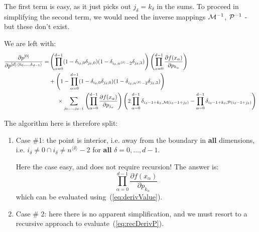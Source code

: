 \documentclass[11pt]{article}
\begin{document}
The first term is easy, as it just picks out $j_\delta = k_\delta$ in the sums. To proceed in simplifying the second term, we would need the inverse mappings ${\cal M}^{-1}$, ${\cal P}^{-1}$ - but these don't exist. 

We are left with:
\begin{equation}
\begin{split}	
\frac{\partial p^{[0]}}{\partial p^{[d]: \langle k_0, \dots, k_{d-1} \rangle}}
=&
\left ( \prod_{\alpha = 0}^{d-1} (1 - \delta_{i_\delta,0}\delta_{j_\delta,0}) (1 - \delta_{i_\delta,n^{\langle \delta \rangle}-2}\delta_{j_\delta,3}) \right )
\left (
\prod_{\alpha=0}^{d-1} 
\frac{
\partial f(x_\alpha)
}{
\partial p_{k_\alpha}
}
\right ) \\
&+ \left ( 1 - \prod_{\alpha = 0}^{d-1} (1 - \delta_{i_\delta,0}\delta_{j_\delta,0}) (1 - \delta_{i_\delta,n^{\langle \delta \rangle}-2}\delta_{j_\delta,3}) \right ) \\
&\hspace{5mm} \times
\sum_{j_0, \dots, j_{d-1}}
\left (
\prod_{\alpha=0}^{d-1} 
\frac{
\partial f(x_\alpha)
}{
\partial p_{j_\alpha}
}
\right ) 
\left (
2 
\prod_{\alpha=0}^{d-1} \delta_{i_\delta-1+k_\delta, {\cal M}(i_\delta-1+j_\delta) }
-
\prod_{\alpha=0}^{d-1} \delta_{i_\delta-1+k_\delta, {\cal P}(i_\delta-1+j_\delta) }
\right ) 
\end{split}
\end{equation}

The algorithm here is therefore split:
\begin{enumerate}
\item Case \#1: the point is interior, i.e. away from the boundary in \textbf{all} dimensions, i.e. $i_\delta \neq 0 \cap i_\delta \neq n^{\langle \delta \rangle} -2$ for \textbf{all} $\delta=0,\dots,d-1$.

Here the case easy, and does not require recursion! The answer is:
\begin{equation}
\prod_{\alpha=0}^{d-1} 
\frac{
\partial f(x_\alpha)
}{
\partial p_{k_\alpha}
}
\end{equation}
which can be evaluated using~(\ref{eq:derivValue}).

\item Case \# 2: here there is no apparent simplification, and we must resort to a recursive approach to evaluate~(\ref{eq:recDerivP}).

\end{enumerate}
\end{document}

